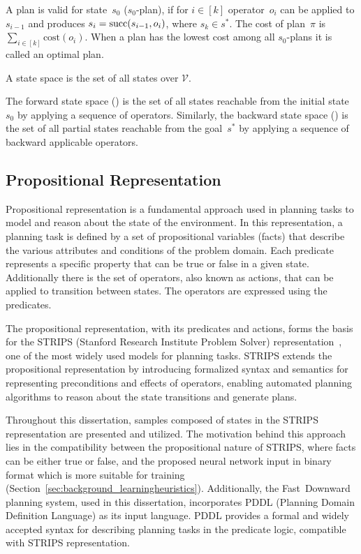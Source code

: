 A plan is valid for state~$s_0$ ($s_0$-plan), if for $i\in[k]$ operator~$o_i$ can be applied to $s_{i-1}$ and produces $s_i=\operatorname{succ}(s_{i-1},o_i)$, where $s_k \in s^*$. The cost of plan~$\pi$ is $\sum_{i\in[k]} \text{cost}(o_i)$. When a plan has the lowest cost among all $s_0$-plans it is called an optimal plan.

\begin{definition}\label{def:statespace}
    A state space is the set of all states over $\mathcal{V}$.
\end{definition}

The forward state space (\fssp) is the set of all states reachable from the initial state~$s_0$ by applying a sequence of operators. Similarly, the backward state space (\bssp) is the set of all partial states reachable from the goal~$s^*$ by applying a sequence of backward applicable operators.

\subsection{Propositional Representation}
\label{sec:background_strips}

Propositional representation is a fundamental approach used in planning tasks to model and reason about the state of the environment. In this representation, a planning task is defined by a set of propositional variables (facts) that describe the various attributes and conditions of the problem domain. Each predicate represents a specific property that can be true or false in a given state. Additionally there is the set of operators, also known as actions, that can be applied to transition between states. The operators are expressed using the predicates. 

The propositional representation, with its predicates and actions, forms the basis for the STRIPS (Stanford Research Institute Problem Solver) representation~\cite{Fikes.Nilsson/1971}, one of the most widely used models for planning tasks. STRIPS extends the propositional representation by introducing formalized syntax and semantics for representing preconditions and effects of operators, enabling automated planning algorithms to reason about the state transitions and generate plans.

Throughout this dissertation, samples composed of states in the STRIPS representation are presented and utilized. The motivation behind this approach lies in the compatibility between the propositional nature of STRIPS, where facts can be either true or false, and the proposed neural network input in binary format which is more suitable for training (Section~\ref{sec:background_learningheuristics}). Additionally, the Fast~Downward planning system, used in this dissertation, incorporates PDDL (Planning Domain Definition Language) as its input language. PDDL provides a formal and widely accepted syntax for describing planning tasks in the predicate logic, compatible with STRIPS representation.

